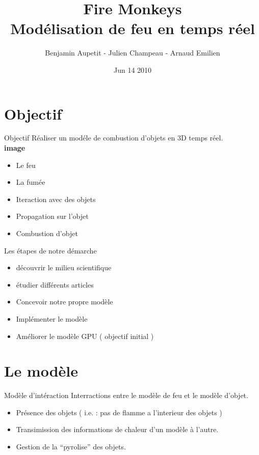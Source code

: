 \documentclass{beamer}
\title{Fire Monkeys\\ Modélisation de feu en temps réel}
\author{Benjamin Aupetit - Julien Champeau - Arnaud Emilien}
\date{Jun 14 2010}
\begin{document}
\begin{frame}
   \titlepage
\end{frame}

\begin{frame}
  \tableofcontents
\end{frame}

\section{Objectif}
\begin{frame}{Objectif}
  Réaliser un modéle de combustion d'objets en 3D temps réel.\\
  \textbf{image}
  \begin{itemize}
    \item{Le feu}%
    \item{La fumée}%
    \item{Iteraction avec des objets}%
    \item{Propagation sur l'objet}%
    \item{Combustion d'objet}%
  \end{itemize}
\end{frame}

\begin{frame}{Les étapes de notre démarche}
  \begin{itemize}
  \item{découvrir le milieu scientifique} %
  \item{étudier différents articles} %
  \item{Concevoir notre propre modèle} %
  \item{Implémenter le modèle} %
  \item{Améliorer le modèle} GPU ( objectif initial ) %
  \end{itemize}
\end{frame}

\section{Le modèle}
\begin{frame}{Modèle d'intéraction}
  Interractions entre le modèle de feu et le modèle d'objet.
  \begin{itemize}
  \item Présence des objets ( i.e. : pas de flamme a l'interieur des objets )
  \item Transimission des informations de chaleur d'un modèle à l'autre.
  \item Gestion de la ``pyrolise'' des objets.
  \end{itemize}
\end{frame}
\end{document}
